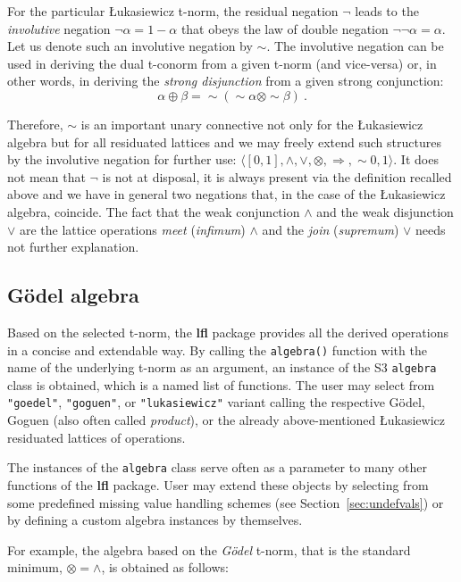 \documentclass[review]{elsarticle}
\newcommand{\pkg}[1]{\textbf{#1}}
\newcommand{\code}[1]{\texttt{#1}}
\begin{document}
For the particular \L ukasiewicz t-norm, the residual negation $\lnot$ leads to the  \emph{involutive} negation $\neg \alpha = 1-\alpha$ that obeys the law of double negation $\lnot\lnot\alpha = \alpha$. Let us denote such an involutive negation by $\sim$. The involutive negation can be used in deriving the dual t-conorm from a given t-norm (and vice-versa) or, in other words, in deriving the \emph{strong disjunction} from a given strong conjunction:
$$\alpha\oplus\beta = {\sim}({\sim}\alpha \otimes {\sim}\beta)\ .$$

Therefore, $\sim$ is an important unary connective not only for the \L ukasiewicz algebra but for all residuated lattices and we may freely extend such structures by the involutive negation for further use: $\langle [0,1], \wedge, \vee, \otimes , \Rightarrow, \sim 0 , 1 \rangle$. It does not mean that $\neg$ is not at disposal, it is always present via the definition recalled above and we have in general two negations that, in the case of the \L ukasiewicz algebra, coincide. The fact that the weak conjunction $\wedge$ and the weak disjunction $\vee$ are the lattice operations \emph{meet} (\emph{infimum})  $\land$ and the \emph{join} (\emph{supremum})  $\lor$ needs not further explanation.


\subsection{G\"odel algebra}
\label{sec:goedel}


Based on the selected t-norm, the \pkg{lfl} package provides all the derived operations in a concise and extendable way. By calling the \code{algebra()} function with the name of the underlying t-norm as an argument, an instance of the S3 \code{algebra} class is obtained, which is a named list of functions. The user may select from \code{"goedel"}, \code{"goguen"}, or \code{"lukasiewicz"} variant calling the respective G\"odel, Goguen (also often called \emph{product}), or the already above-mentioned \L ukasiewicz residuated lattices of operations. 

The instances of the \code{algebra} class serve often as a parameter to many other functions of the \pkg{lfl} package. User may extend these objects by selecting from some predefined missing value handling schemes (see Section~\ref{sec:undefvals}) or by defining a custom algebra instances by themselves.


For example, the algebra based on the \emph{G\"odel} t-norm, that is the standard minimum, $\otimes = \wedge$, is obtained as follows:
%

\end{document}
